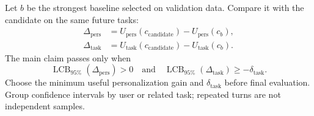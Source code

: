 \documentclass[11pt]{article}
\newcommand{\utask}{U_{\mathrm{task}}}
\newcommand{\upers}{U_{\mathrm{pers}}}
\begin{document}
Let $b$ be the strongest baseline selected on validation data.  Compare it
with the candidate on the same future tasks:
\begin{align}
  \Delta_{\mathrm{pers}}
    &= \upers(c_{\mathrm{candidate}})-\upers(c_b),\\
  \Delta_{\mathrm{task}}
    &= \utask(c_{\mathrm{candidate}})-\utask(c_b).
\end{align}
The main claim passes only when
\begin{equation}
  \operatorname{LCB}_{95\%}(\Delta_{\mathrm{pers}})>0
  \quad\text{and}\quad
  \operatorname{LCB}_{95\%}(\Delta_{\mathrm{task}})
  \ge -\delta_{\mathrm{task}}.
  \label{eq:primary-gate}
\end{equation}
Choose the minimum useful personalization gain and
$\delta_{\mathrm{task}}$ before final evaluation.  Group confidence intervals
by user or related task; repeated turns are not independent samples.
\end{document}
